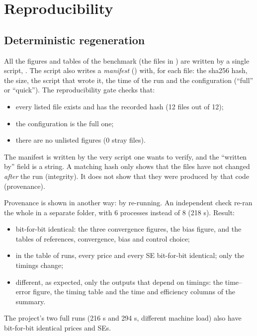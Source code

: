 \section{Reproducibility}
\subsection{Deterministic regeneration}
All the figures and tables of the benchmark (the  files in ) are written by a
single script, . The script also writes a \emph{manifest}
() with, for each file: the sha256 hash, the size, the script that wrote it, the time of
the run and the configuration (``full'' or ``quick''). The reproducibility gate checks that:
\begin{itemize}
\item every listed file exists and has the recorded hash (12 files out of 12);
\item the configuration is the full one;
\item there are no unlisted  figures (0 stray files).
\end{itemize}

\begin{attenzione}[title={Integrity is not provenance}]
The manifest is written by the very script one wants to verify, and the ``written by'' field is a string. A matching
hash only shows that the files have not changed \emph{after} the run (integrity). It does not show that they were
produced by that code (provenance).

Provenance is shown in another way: by re-running. An independent check re-ran the whole  in
a separate folder, with 6 processes instead of 8 (218 s). Result:
\begin{itemize}
\item bit-for-bit identical: the three convergence figures, the bias figure, and the tables of references,
convergence, bias and control choice;
\item in the table of runs, every price and every SE bit-for-bit identical; only the timings change;
\item different, as expected, only the outputs that depend on timings: the time--error figure, the timing table and
the time and efficiency columns of the summary.
\end{itemize}
The project's two full runs (216 s and 294 s, different machine load) also have bit-for-bit identical prices and SEs.
\end{attenzione}

